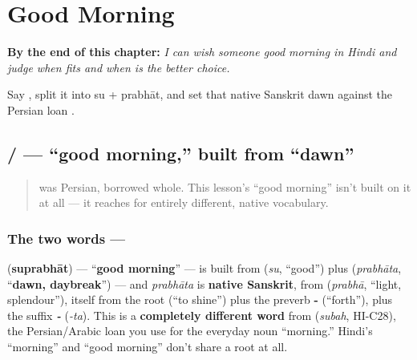 
\chapter{Good Morning}
\label{ch:hi-good-morning}

\begin{chapteropening}
\textbf{By the end of this chapter:} \emph{I can wish someone good morning in Hindi and judge when  fits and when  is the better choice.}

Say , split it into su + prabhāt, and set that native Sanskrit dawn against the Persian loan .
\end{chapteropening}

\section[\texorpdfstring{\hi{सुप्रभात} / \hi{प्रभात} (suprabhāt / prabhāt)}{सुप्रभात / प्रभात (suprabhāt / prabhāt)}]{ /  — \textquotedblleft{}good morning,\textquotedblright{} built from \textquotedblleft{}dawn\textquotedblright{}}

\label{lesson:HI-C31-suprabhat}



\begin{quote}
 was Persian, borrowed whole. This lesson's \textquotedblleft{}good morning\textquotedblright{} isn't built on it at all — it reaches for entirely different, native vocabulary.
\end{quote}

\subsection*{The two words — }
\textbf{} (\textbf{suprabhāt}) — \textquotedblleft{}\textbf{good morning}\textquotedblright{} — is built from \textbf{} (\emph{su}, \textquotedblleft{}good\textquotedblright{}) plus \textbf{} (\emph{prabhāta}, \textquotedblleft{}\textbf{dawn, daybreak}\textquotedblright{}) — and \emph{prabhāta} is \textbf{native Sanskrit}, from \textbf{} (\emph{prabhā}, \textquotedblleft{}light, splendour\textquotedblright{}), itself from the root \textbf{} (\textquotedblleft{}to shine\textquotedblright{}) plus the preverb \textbf{-} (\textquotedblleft{}forth\textquotedblright{}), plus the suffix \emph{\textbf{-}} (\emph{-ta}). This is a \textbf{completely different word} from \textbf{} (\emph{subah}, HI-C28), the Persian/Arabic loan you use for the everyday noun \textquotedblleft{}morning.\textquotedblright{} Hindi's \textquotedblleft{}morning\textquotedblright{} and \textquotedblleft{}good morning\textquotedblright{} don't share a root at all.

